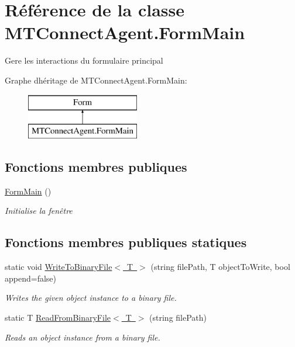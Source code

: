 \hypertarget{class_m_t_connect_agent_1_1_form_main}{}\section{Référence de la classe M\+T\+Connect\+Agent.\+Form\+Main}
\label{class_m_t_connect_agent_1_1_form_main}


Gere les interactions du formulaire principal  


Graphe d\textquotesingle{}héritage de M\+T\+Connect\+Agent.\+Form\+Main\+:\begin{figure}[H]
\begin{center}
\leavevmode
\includegraphics[height=2.000000cm]{class_m_t_connect_agent_1_1_form_main}
\end{center}
\end{figure}
\subsection*{Fonctions membres publiques}
\begin{DoxyCompactItemize}
\item 
\mbox{\hyperlink{class_m_t_connect_agent_1_1_form_main_a13aab0ed9e05b8165e341ead37cb121e}{Form\+Main}} ()
\begin{DoxyCompactList}\small\item\em Initialise la fenêtre \end{DoxyCompactList}\end{DoxyCompactItemize}
\subsection*{Fonctions membres publiques statiques}
\begin{DoxyCompactItemize}
\item 
static void \mbox{\hyperlink{class_m_t_connect_agent_1_1_form_main_a6233cef0809d41ecc061bd6fa63afd5d}{Write\+To\+Binary\+File$<$ T $>$}} (string file\+Path, T object\+To\+Write, bool append=false)
\begin{DoxyCompactList}\small\item\em Writes the given object instance to a binary file. \end{DoxyCompactList}\item 
static T \mbox{\hyperlink{class_m_t_connect_agent_1_1_form_main_af15030e628945bf0e6af793a954560b0}{Read\+From\+Binary\+File$<$ T $>$}} (string file\+Path)
\begin{DoxyCompactList}\small\item\em Reads an object instance from a binary file. \end{DoxyCompactList}\end{DoxyCompactItemize}
